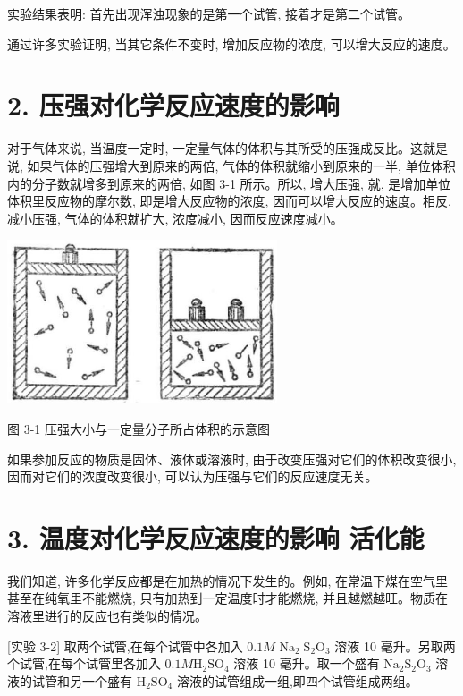 \documentclass[10pt]{article}
\begin{document}
实验结果表明: 首先出现浑浊现象的是第一个试管, 接着才是第二个试管。

通过许多实验证明, 当其它条件不变时, 增加反应物的浓度, 可以增大反应的速度。

\section*{2. 压强对化学反应速度的影响}

对于气体来说, 当温度一定时, 一定量气体的体积与其所受的压强成反比。这就是说, 如果气体的压强增大到原来的两倍, 气体的体积就缩小到原来的一半, 单位体积内的分子数就增多到原来的两倍, 如图 3-1 所示。所以, 增大压强, 就, 是增加单位体积里反应物的摩尔数, 即是增大反应物的浓度, 因而可以增大反应的速度。相反, 减小压强, 气体的体积就扩大, 浓度减小, 因而反应速度减小。

\begin{center}
\includegraphics[max width=0.6\textwidth]{images/01912d13-9986-7822-a012-3f3f7be99dcb_68_697520.jpg}
\end{center}

图 3-1 压强大小与一定量分子所占体积的示意图

如果参加反应的物质是固体、液体或溶液时, 由于改变压强对它们的体积改变很小, 因而对它们的浓度改变很小, 可以认为压强与它们的反应速度无关。

\section*{3. 温度对化学反应速度的影响 活化能}

我们知道, 许多化学反应都是在加热的情况下发生的。例如, 在常温下煤在空气里甚至在纯氧里不能燃烧, 只有加热到一定温度时才能燃烧, 并且越燃越旺。物质在溶液里进行的反应也有类似的情况。

[实验 3-2] 取两个试管,在每个试管中各加入 \({0.1M}\) \({\mathrm{{Na}}}_{2}{\mathrm{\;S}}_{2}{\mathrm{O}}_{3}\) 溶液 10 毫升。另取两个试管,在每个试管里各加入 \({0.1M}{\mathrm{H}}_{2}{\mathrm{{SO}}}_{4}\) 溶液 10 毫升。取一个盛有 \({\mathrm{{Na}}}_{2}{\mathrm{S}}_{2}{\mathrm{O}}_{3}\) 溶液的试管和另一个盛有 \({\mathrm{H}}_{2}{\mathrm{{SO}}}_{4}\) 溶液的试管组成一组,即四个试管组成两组。
\end{document}
